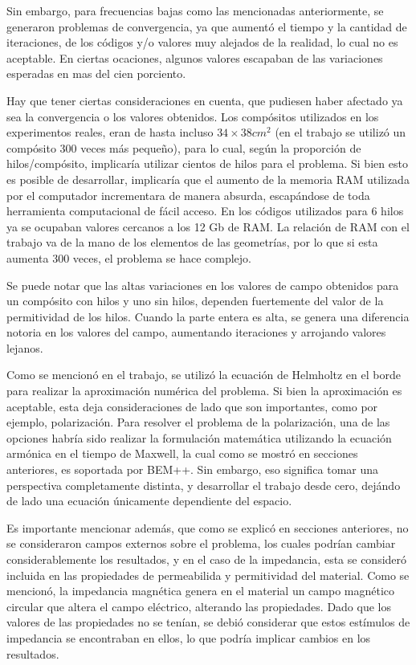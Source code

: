 \documentclass[12pt,letterpaper]{report}
\numberwithin{equation}{section}
\begin{document}
Sin embargo, para frecuencias bajas como las mencionadas anteriormente, se generaron problemas de convergencia, ya que aumentó el tiempo y la cantidad de iteraciones, de los códigos y/o valores muy alejados de la realidad, lo cual no es aceptable. En ciertas ocaciones, algunos valores escapaban de las variaciones esperadas en mas del cien porciento. 

Hay que tener ciertas consideraciones en cuenta, que pudiesen haber afectado ya sea la convergencia o los valores obtenidos. Los compósitos utilizados en los experimentos reales, eran de hasta incluso $34 \times 38 cm^2$ (en el trabajo se utilizó un compósito 300 veces más pequeño), para lo cual, según la proporción de hilos/compósito, implicaría utilizar cientos de hilos para el problema. Si bien esto es posible de desarrollar, implicaría que el aumento de la memoria RAM utilizada por el computador incrementara de manera absurda, escapándose de toda herramienta computacional de fácil acceso. En los códigos utilizados para 6 hilos ya se ocupaban valores cercanos a los 12 Gb de RAM. La relación de RAM con el trabajo va de la mano de los elementos de las geometrías, por lo que si esta aumenta 300 veces, el problema se hace complejo.

Se puede notar que las altas variaciones en los valores de campo obtenidos para un compósito con hilos y uno sin hilos, dependen fuertemente del valor de la permitividad de los hilos. Cuando la parte entera es alta, se genera una diferencia notoria en los valores del campo, aumentando iteraciones y arrojando valores lejanos.

Como se mencionó en el trabajo, se utilizó la ecuación de Helmholtz en el borde para realizar la aproximación numérica del problema. Si bien la aproximación es aceptable, esta deja consideraciones de lado que son importantes, como por ejemplo, polarización. Para resolver el problema de la polarización, una de las opciones habría sido realizar la formulación matemática utilizando la ecuación armónica en el tiempo de Maxwell, la cual como se mostró en secciones anteriores, es soportada por BEM++. Sin embargo, eso significa tomar una perspectiva completamente distinta, y desarrollar el trabajo desde cero, dejándo de lado una ecuación únicamente dependiente del espacio.

Es importante mencionar además, que como se explicó en secciones anteriores, no se consideraron campos externos sobre el problema, los cuales podrían cambiar considerablemente los resultados, y en el caso de la impedancia, esta se consideró incluida en las propiedades de permeabilida y permitividad del material. Como se mencionó, la impedancia magnética genera en el material un campo magnético circular que altera el campo eléctrico, alterando las propiedades. Dado que los valores de las propiedades no se tenían, se debió considerar que estos estímulos de impedancia se encontraban en ellos, lo que podría implicar cambios en los resultados.
\end{document}
